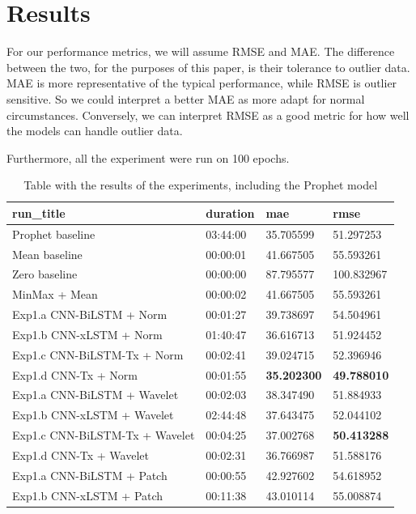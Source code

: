 \section{Results}

For our performance metrics, we will assume RMSE and MAE. The difference between the two, for the purposes of this paper, is their tolerance to outlier data.
MAE is more representative of the typical performance, while RMSE is outlier sensitive. So we could interpret a better MAE as more adapt for normal circumstances. Conversely, 
we can interpret RMSE as a good metric for how well the models can handle outlier data.

Furthermore, all the experiment were run on 100 epochs.
\begin{table}[ht]
\centering
\caption{Table with the results of the experiments, including the Prophet model}
\begin{tabular}{|l|l|l|l|}
    \hline
    \textbf{run\_title} & \textbf{duration} & \textbf{mae} & \textbf{rmse} \\ \hline
    Prophet baseline & 03:44:00 & 35.705599 & 51.297253 \\ \hline
    Mean baseline & 00:00:01 & 41.667505 & 55.593261 \\ \hline
    Zero baseline & 00:00:00 & 87.795577 & 100.832967 \\ \hline
    MinMax + Mean & 00:00:02 & 41.667505 & 55.593261 \\ \hline
    Exp1.a CNN-BiLSTM + Norm & 00:01:27 & 39.738697 & 54.504961 \\ \hline
    Exp1.b CNN-xLSTM + Norm & 01:40:47 & 36.616713 & 51.924452 \\ \hline
    Exp1.c CNN-BiLSTM-Tx + Norm & 00:02:41 & 39.024715 & 52.396946 \\ \hline
    Exp1.d CNN-Tx + Norm & 00:01:55 & \textbf{35.202300} & \textbf{49.788010} \\ \hline
    Exp1.a CNN-BiLSTM + Wavelet & 00:02:03 & 38.347490 & 51.884933 \\ \hline
    Exp1.b CNN-xLSTM + Wavelet & 02:44:48 & 37.643475 & 52.044102 \\ \hline
    Exp1.c CNN-BiLSTM-Tx + Wavelet & 00:04:25 & 37.002768 & \textbf{50.413288} \\ \hline
    Exp1.d CNN-Tx + Wavelet & 00:02:31 & 36.766987 & 51.588176 \\ \hline
    Exp1.a CNN-BiLSTM + Patch & 00:00:55 & 42.927602 & 54.618952 \\ \hline
    Exp1.b CNN-xLSTM + Patch & 00:11:38 & 43.010114 & 55.008874 \\ \hline

\end{tabular}
\end{table}

